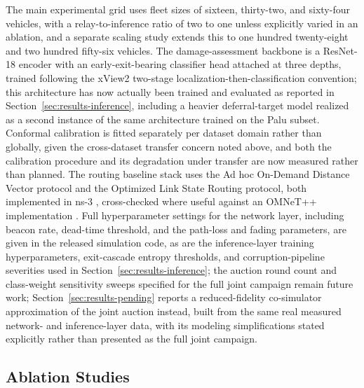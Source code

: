 \documentclass[drones,article,submit,moreauthors]{Definitions/mdpi}
\begin{document}
The main experimental grid uses fleet sizes of sixteen, thirty-two, and sixty-four vehicles, with a relay-to-inference ratio of two to one unless explicitly varied in an ablation, and a separate scaling study extends this to one hundred twenty-eight and two hundred fifty-six vehicles. The damage-assessment backbone is a ResNet-18 encoder with an early-exit-bearing classifier head attached at three depths, trained following the xView2 two-stage localization-then-classification convention; this architecture has now actually been trained and evaluated as reported in Section~\ref{sec:results-inference}, including a heavier deferral-target model realized as a second instance of the same architecture trained on the Palu subset. Conformal calibration is fitted separately per dataset domain rather than globally, given the cross-dataset transfer concern noted above, and both the calibration procedure and its degradation under transfer are now measured rather than planned. The routing baseline stack uses the Ad hoc On-Demand Distance Vector protocol and the Optimized Link State Routing protocol, both implemented in ns-3 \cite{perkins2003aodv,clausen2003olsr,riley2010ns3}, cross-checked where useful against an OMNeT++ implementation \cite{varga2001omnet}. Full hyperparameter settings for the network layer, including beacon rate, dead-time threshold, and the path-loss and fading parameters, are given in the released simulation code, as are the inference-layer training hyperparameters, exit-cascade entropy thresholds, and corruption-pipeline severities used in Section~\ref{sec:results-inference}; the auction round count and class-weight sensitivity sweeps specified for the full joint campaign remain future work; Section~\ref{sec:results-pending} reports a reduced-fidelity co-simulator approximation of the joint auction instead, built from the same real measured network- and inference-layer data, with its modeling simplifications stated explicitly rather than presented as the full joint campaign.

\subsection{Ablation Studies}
\end{document}
